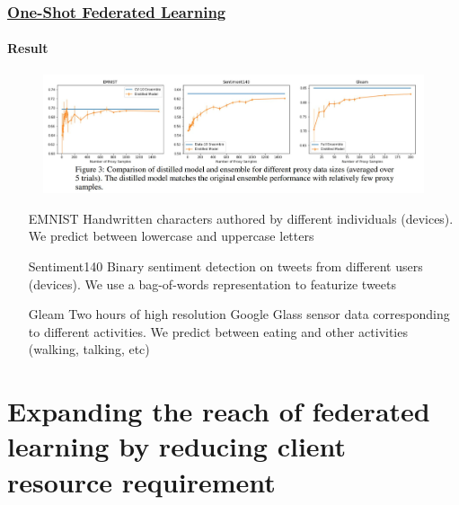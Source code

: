 \documentclass[10pt]{beamer}
\begin{document}
    \begin{frame}
        \frametitle{
            \href{https://arxiv.org/pdf/1902.11175.pdf}{
                One-Shot Federated Learning
            }
        }
        
        \framesubtitle{
            Result
        }

        \begin{figure}
            \includegraphics[width=\textwidth]{src/img/OneShotFedResult.JPG}
        \end{figure}
        {\small
            \begin{itemize}
                \item[EMNIST]{ 
                    Handwritten characters authored by different individuals (devices). We predict between lowercase and uppercase letters
                }
                \item[Sentiment140]{
                    Binary sentiment detection on tweets from different users (devices). We use a bag-of-words representation to featurize tweets
                } 
                \item[Gleam]{
                    Two hours of high resolution Google Glass sensor data corresponding to different activities. We predict between eating and other activities (walking, talking, etc)
                }
            \end{itemize}
        }

    \end{frame}

    \section*{Expanding the reach of federated learning by reducing client resource requirement}
\end{document}

